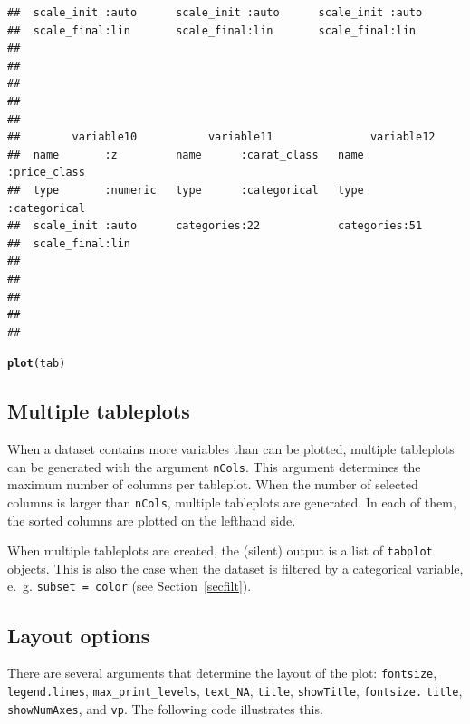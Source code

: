 \documentclass[11pt, fleqn, a4paper]{article}\usepackage[]{graphicx}\usepackage[]{color}
\makeatletter
\newcommand{\hlstd}[1]{\textcolor[rgb]{0.345,0.345,0.345}{#1}}%
\newcommand{\hlkwd}[1]{\textcolor[rgb]{0.737,0.353,0.396}{\textbf{#1}}}%
\newenvironment{kframe}{%
 \def\at@end@of@kframe{}%
 \ifinner\ifhmode%
  \def\at@end@of@kframe{\end{minipage}}%
  \begin{minipage}{\columnwidth}%
 \fi\fi%
 \def\FrameCommand##1{\hskip\@totalleftmargin \hskip-\fboxsep
 \colorbox{shadecolor}{##1}\hskip-\fboxsep
     \hskip-\linewidth \hskip-\@totalleftmargin \hskip\columnwidth}%
 \MakeFramed {\advance\hsize-\width
   \@totalleftmargin\z@ \linewidth\hsize
   \@setminipage}}%
 {\par\unskip\endMakeFramed%
 \at@end@of@kframe}
\newenvironment{knitrout}{}{} %
\makeatother
\begin{document}
\begin{knitrout}
\begin{kframe}
\begin{verbatim}
##  scale_init :auto      scale_init :auto      scale_init :auto     
##  scale_final:lin       scale_final:lin       scale_final:lin      
##                                                                   
##                                                                   
##                                                                   
##                                                                   
##                                                                   
##        variable10           variable11               variable12         
##  name       :z         name      :carat_class   name      :price_class  
##  type       :numeric   type      :categorical   type      :categorical  
##  scale_init :auto      categories:22            categories:51           
##  scale_final:lin                                                        
##                                                                         
##                                                                         
##                                                                         
##                                                                         
## 
\end{verbatim}
\begin{alltt}
\hlkwd{plot}\hlstd{(tab)}
\end{alltt}
\end{kframe}
\end{knitrout}


\subsection{Multiple tableplots}\label{secmult}

When a dataset contains more variables than can be plotted, multiple tableplots can be generated with the argument {\tt nCols}. This argument determines the maximum number of columns per tableplot. When the number of selected columns is larger than {\tt nCols}, multiple tableplots are generated. In each of them, the sorted columns are plotted on the lefthand side. 

When multiple tableplots are created, the (silent) output is a list of {\tt tabplot} objects. This is also the case when the dataset is filtered by a categorical variable, e.~g. {\tt subset = color}
(see Section~\ref{secfilt}).

\subsection{Layout options}\label{seclay}
There are several arguments that determine the layout of the plot:
{\tt fontsize}, {\tt legend.lines}, {\tt max\_print\_levels}, {\tt text\_NA}, {\tt title}, {\tt showTitle}, {\tt fontsize.} {\tt title}, {\tt showNumAxes}, and {\tt vp}. The following code illustrates this.
\end{document}

